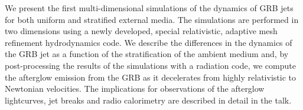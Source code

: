 


\bigskip



\bigskip

\noindent We present the first multi-dimensional simulations of the dynamics of GRB jets for both uniform and stratified external media. The simulations are performed in two dimensions using a newly developed, special relativistic, adaptive mesh refinement hydrodynamics code. 
We describe the differences in the dynamics of the GRB jet as a function of the stratification of the ambient medium and, by post-processing the results of the simulations with a radiation code, we compute the afterglow emission from the GRB as it decelerates from highly relativistic to Newtonian velocities. The implications for observations of the afterglow lightcurves, jet breaks and radio calorimetry are described in detail in the talk.

